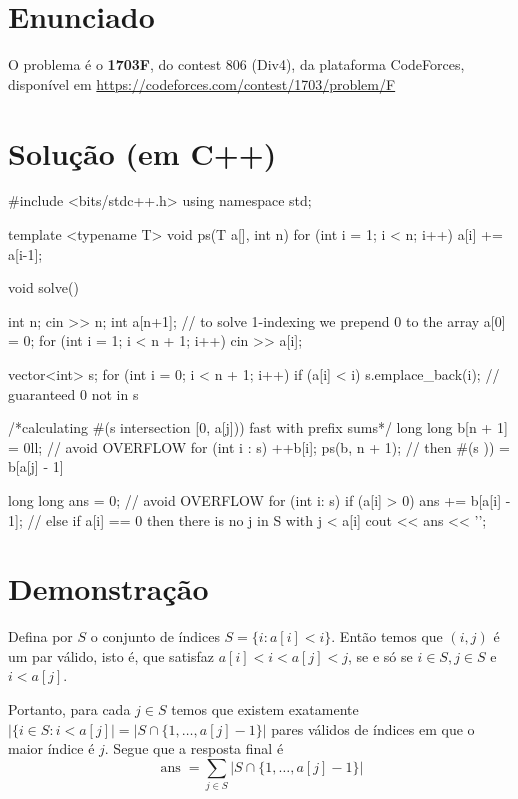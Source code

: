 \documentclass{article}
\begin{document}
\section{Enunciado}
O problema é o \textbf{1703F}, do contest 806 (Div4), da plataforma CodeForces, disponível em \url{https://codeforces.com/contest/1703/problem/F}

\section{Solução (em C++)}

\begin{code}[C++]
#include <bits/stdc++.h>
using namespace std;
    
template <typename T> 
void ps(T a[], int n){
    for (int i = 1; i < n; i++){
        a[i] += a[i-1];
    }
}
  
void solve(){
    int n;
    cin >> n;
    int a[n+1]; // to solve 1-indexing we prepend 0 to the array
    a[0] = 0;
    for (int i = 1; i < n + 1; i++) cin >> a[i];
    
    vector<int> s;
    for (int i = 0; i < n + 1; i++){
        if (a[i] < i) s.emplace_back(i);
    } // guaranteed 0 not in s 
    
    /*calculating #(s intersection [0, a[j])) fast with prefix sums*/
    long long b[n + 1] = {0ll}; // avoid OVERFLOW
    for (int i : s) ++b[i];
    ps(b, n + 1);
    // then #(s \cap [0, a[j])) = b[a[j] - 1]
    
    long long ans = 0; // avoid OVERFLOW
    for (int i: s){
        if (a[i] > 0){
              ans += b[a[i] - 1];
        } 
        // else if a[i] == 0 then there is no j in S with j < a[i]
    }
    cout << ans << '\n';
}
\end{code}  



\section{Demonstração}
Defina por \(S\) o conjunto de índices \(S = \{i: a[i] < i\}\). Então temos que \((i, j)\) é um par válido, isto é, que satisfaz \(a[i] < i < a[j] < j\), se e só se \(i \in S, j \in S\) e \(i < a[j]\).

Portanto, para cada \(j \in S\) temos que existem exatamente \(|\{i \in S: i < a[j]| = |S \cap \{1, \dotsc, a[j] - 1\}|\) pares válidos de índices em que o maior índice é \(j\). Segue que a resposta final é 
\[\operatorname{ans} = \sum_{j \in S}|S \cap \{1, \dotsc, a[j] - 1\}|\]
\end{document}
